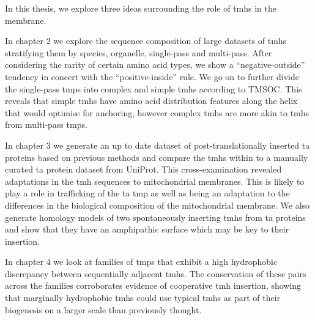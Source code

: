 In this thesis, we explore three ideas surrounding the role of \gls{tmh}s in the membrane.

In chapter 2 we explore the sequence composition of large datasets of \gls{tmh}s stratifying them by species, organelle, single\--pass and multi\--pass.
After considering the rarity of certain amino acid types, we show a ``negative\--outside'' tendency in concert with the ``positive\--inside'' rule.
We go on to further divide the single\--pass \gls{tmp}s into complex and simple \gls{tmh}s according to TMSOC.
This reveals that simple \gls{tmh}s have amino acid distribution features along the helix that would optimise for anchoring, however complex \gls{tmh}s are more akin to \gls{tmh}s from multi\--pass \gls{tmp}s.

In chapter 3 we generate an up to date dataset of post\--translationally inserted \gls{ta} proteins based on previous methods and compare the \gls{tmh}s within to a manually curated \gls{ta} protein dataset from UniProt.
This cross\--examination revealed  adaptations in the \gls{tmh} sequences to mitochondrial membranes.
This is likely to play a role in trafficking of the \gls{ta} \gls{tmp} as well as being an adaptation to the differences in the biological composition of the mitochondrial membrane.
We also generate homology models of two spontaneously inserting \gls{tmh}s from \gls{ta} proteins and show that they have an amphipathic surface which may be key to their insertion.

In chapter 4 we look at families of \gls{tmp}s that exhibit a high hydrophobic discrepancy between sequentially adjacent \gls{tmh}s.
The conservation of these pairs across the families corroborates evidence of cooperative \gls{tmh} insertion, showing that marginally hydrophobic \gls{tmh}s could use typical \gls{tmh}s as part of their biogenesis on a larger scale than previously thought.
